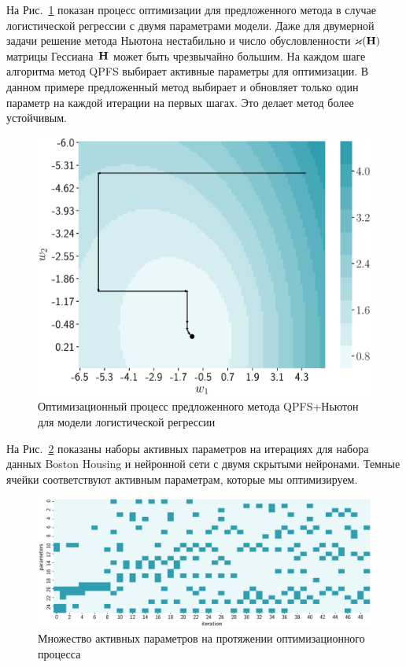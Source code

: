 На Рис.~\ref{ch4:fig:irls_qpfs_2d} показан процесс оптимизации для предложенного метода в случае логистической регрессии с двумя параметрами модели. 
Даже для двумерной задачи решение метода Ньютона нестабильно и число обусловленности $\varkappa(\mathbf{H})$ матрицы Гессиана~$\mathbf{H}$ может быть чрезвычайно большим. 
На каждом шаге алгоритма метод QPFS выбирает активные параметры для оптимизации. 
В данном примере предложенный метод выбирает и обновляет только один параметр на каждой итерации на первых шагах. 
Это делает метод более устойчивым.

\begin{figure}[!h]
	\centering
	\includegraphics[width=0.6\linewidth]{figs/ch4/irls_qpfs_2d}	 
	\caption{Оптимизационный процесс предложенного метода QPFS+Ньютон для модели логистической регрессии}
	\label{ch4:fig:irls_qpfs_2d}
\end{figure}

На Рис.~\ref{ch4:fig:active_params_wrt_iters} показаны наборы активных параметров на итерациях для набора данных Boston Housing и нейронной сети с двумя скрытыми нейронами. 
Темные ячейки соответствуют активным параметрам, которые мы оптимизируем.
 
\begin{figure}[h]
	\centering
	\includegraphics[width=\linewidth]{figs/ch4/active_params_wrt_iters}	
	\caption{Множество активных параметров на протяжении оптимизационного процесса}
	\label{ch4:fig:active_params_wrt_iters}
\end{figure}

